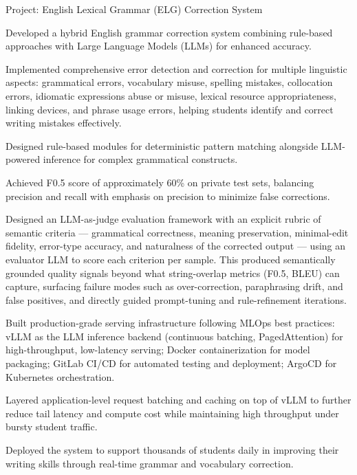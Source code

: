 \begin{cventries}
\vspace{8pt}

  \cventry
    {Project: English Lexical Grammar (ELG) Correction System}
    {}
    {
      \begin{cvitems}
        \item {Developed a hybrid English grammar correction system combining rule-based approaches with Large Language Models (LLMs) for enhanced accuracy.}
        \item {Implemented comprehensive error detection and correction for multiple linguistic aspects: grammatical errors, vocabulary misuse, spelling mistakes, collocation errors, idiomatic expressions abuse or misuse, lexical resource appropriateness, linking devices, and phrase usage errors, helping students identify and correct writing mistakes effectively.}
        \item {Designed rule-based modules for deterministic pattern matching alongside LLM-powered inference for complex grammatical constructs.}
        \item {Achieved F0.5 score of approximately 60\% on private test sets, balancing precision and recall with emphasis on precision to minimize false corrections.}
        \item {Designed an LLM-as-judge evaluation framework with an explicit rubric of semantic criteria — grammatical correctness, meaning preservation, minimal-edit fidelity, error-type accuracy, and naturalness of the corrected output — using an evaluator LLM to score each criterion per sample. This produced semantically grounded quality signals beyond what string-overlap metrics (F0.5, BLEU) can capture, surfacing failure modes such as over-correction, paraphrasing drift, and false positives, and directly guided prompt-tuning and rule-refinement iterations.}
        \item {Built production-grade serving infrastructure following MLOps best practices: vLLM as the LLM inference backend (continuous batching, PagedAttention) for high-throughput, low-latency serving; Docker containerization for model packaging; GitLab CI/CD for automated testing and deployment; ArgoCD for Kubernetes orchestration.}
        \item {Layered application-level request batching and caching on top of vLLM to further reduce tail latency and compute cost while maintaining high throughput under bursty student traffic.}
        \item {Deployed the system to support thousands of students daily in improving their writing skills through real-time grammar and vocabulary correction.}
      \end{cvitems}
    }


\end{cventries}
